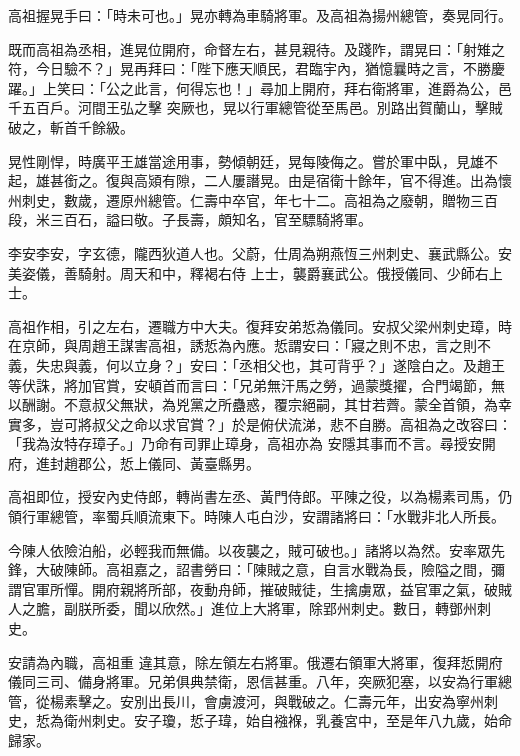 \begin{pinyinscope}
 高祖握晃手曰：「時未可也。」晃亦轉為車騎將軍。及高祖為揚州總管，奏晃同行。



 既而高祖為丞相，進晃位開府，命督左右，甚見親待。及踐阼，謂晃曰：「射雉之符，今日驗不？」晃再拜曰：「陛下應天順民，君臨宇內，猶憶曩時之言，不勝慶躍。」上笑曰：「公之此言，何得忘也！」尋加上開府，拜右衛將軍，進爵為公，邑千五百戶。河間王弘之擊
 突厥也，晃以行軍總管從至馬邑。別路出賀蘭山，擊賊破之，斬首千餘級。



 晃性剛悍，時廣平王雄當途用事，勢傾朝廷，晃每陵侮之。嘗於軍中臥，見雄不起，雄甚銜之。復與高熲有隙，二人屢譖晃。由是宿衛十餘年，官不得進。出為懷州刺史，數歲，遷原州總管。仁壽中卒官，年七十二。高祖為之廢朝，贈物三百段，米三百石，謚曰敬。子長壽，頗知名，官至驃騎將軍。



 李安李安，字玄德，隴西狄道人也。父蔚，仕周為朔燕恆三州刺史、襄武縣公。安美姿儀，善騎射。周天和中，釋褐右侍
 上士，襲爵襄武公。俄授儀同、少師右上士。



 高祖作相，引之左右，遷職方中大夫。復拜安弟悊為儀同。安叔父梁州刺史璋，時在京師，與周趙王謀害高祖，誘悊為內應。悊謂安曰：「寢之則不忠，言之則不義，失忠與義，何以立身？」安曰：「丞相父也，其可背乎？」遂陰白之。及趙王等伏誅，將加官賞，安頓首而言曰：「兄弟無汗馬之勞，過蒙獎擢，合門竭節，無以酬謝。不意叔父無狀，為兇黨之所蠱惑，覆宗絕嗣，其甘若薺。蒙全首領，為幸實多，豈可將叔父之命以求官賞？」於是俯伏流涕，悲不自勝。高祖為之改容曰：「我為汝特存璋子。」乃命有司罪止璋身，高祖亦為
 安隱其事而不言。尋授安開府，進封趙郡公，悊上儀同、黃臺縣男。



 高祖即位，授安內史侍郎，轉尚書左丞、黃門侍郎。平陳之役，以為楊素司馬，仍領行軍總管，率蜀兵順流東下。時陳人屯白沙，安謂諸將曰：「水戰非北人所長。



 今陳人依險泊船，必輕我而無備。以夜襲之，賊可破也。」諸將以為然。安率眾先鋒，大破陳師。高祖嘉之，詔書勞曰：「陳賊之意，自言水戰為長，險隘之間，彌謂官軍所憚。開府親將所部，夜動舟師，摧破賊徒，生擒虜眾，益官軍之氣，破賊人之膽，副朕所委，聞以欣然。」進位上大將軍，除郢州刺史。數日，轉鄧州刺史。



 安請為內職，高祖重
 違其意，除左領左右將軍。俄遷右領軍大將軍，復拜悊開府儀同三司、備身將軍。兄弟俱典禁衛，恩信甚重。八年，突厥犯塞，以安為行軍總管，從楊素擊之。安別出長川，會虜渡河，與戰破之。仁壽元年，出安為寧州刺史，悊為衛州刺史。安子瓊，悊子瑋，始自襁褓，乳養宮中，至是年八九歲，始命歸家。




\end{pinyinscope}
